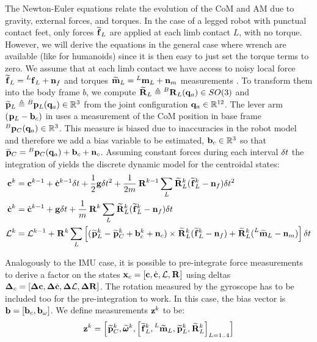 The Newton-Euler equations  relate the evolution of the CoM and AM due to gravity, external forces, and torques. 
In the case of a legged robot with punctual contact feet, only forces $\prescript{}{}{\widetilde{{\bf f}}}_{L}$ are applied at each limb contact $L$, with no torque. 
However, we will derive the equations in the general case where wrench are available (like for humanoids) since it is then easy to just set the 
torque terms to zero. 
We assume that at each limb contact we have access to noisy local force $\prescript{}{}{\widetilde{{\bf f}}}_{L} = \prescript{L}{}{{\bf f}}_{L} + {\bf n}_f$ and torques 
$\prescript{}{}{\widetilde{\bf m}}_{L} = \prescript{L}{}{\bf m}_{L} + {\bf n}_m$ measurements . 
To transform them into the body frame $b$, we compute $\prescript{}{}{\widetilde{{\bf R}}}_{L} \triangleq \prescript{B}{}{{\bf R}}_{L}({\bf q}_a)  \in SO(3)$ and $\prescript{}{}{\widetilde{{\bf p}}}_{L} \triangleq \prescript{B}{}{{\bf p}}_{L}({\bf q}_a) \in \mathbb{R}^3 $ from the joint configuration ${\bf q}_a  \in \mathbb{R}^{12}$. 
The lever arm $(\prescript{}{}{{\bf p}}_{L}-{\bf b}_c)$ in  uses a measurement of the CoM position in base frame $ \prescript{B}{}{{\bf p}}_{C}({\bf q}_a) \in \mathbb{R}^3$. 
This measure is biased due to inaccuracies in the robot model and therefore we add a bias variable to be estimated, ${\bf b}_c \in \mathbb{R}^3$ so that $\prescript{}{}{\widetilde{{\bf p}}}_{C} = \prescript{B}{}{{\bf p}}_{C}({\bf q}_a) + {\bf b}_c + {\bf n}_c$.
Assuming constant forces during each interval $\delta t$ 
the integration of  yields the discrete dynamic model for the centroidal states:
%
\begin{equation}
    \begin{split}
        {\bf c}^{k} &= {\bf c}^{k-1} + \dot{{\bf c}}^{k-1} \delta t+\frac{1}{2} {\bf g} \delta t^2 + \frac{1}{2m} \prescript{}{}{{\bf R}}_{}^{k-1} \sum_L \prescript{}{}{\widetilde{{\bf R}}}_{L}^k (\prescript{}{}{\widetilde{{\bf f}}}_{L}^k - {\bf n}_{f}) \delta t^2
        \\
        \dot{{\bf c}}^{k}&= \dot{{\bf c}}^{k-1} + {\bf g} \delta t + \frac{1}{m} \prescript{}{}{{\bf R}}_{}^k \sum_L\prescript{}{}{\widetilde{{\bf R}}}_{L}^k (\prescript{}{}{\widetilde{{\bf f}}}_{L}^k - {\bf n}_{f}) \delta t 
        \\
        \mathcal{L}^{k} &= \mathcal{L}^{k-1} +\prescript{}{}{{\bf R}}_{}^k \sum_L \left[ (\prescript{}{}{\widetilde{{\bf p}}}_{L}^k  - \prescript{}{}{\widetilde{{\bf p}}}_{C}^k +  {\bf b}_{c}^k + {\bf n}_{c}) \times \prescript{}{}{\widetilde{{\bf R}}}_{L}^k(\prescript{}{}{\widetilde{{\bf f}}}_{L}^k - {\bf n}_{f}) 
                                                        + \prescript{}{}{\widetilde{{\bf R}}}_{L}^k(\prescript{L}{}{\widetilde{\bf m}}_{L} - {\bf n}_m)\right]\delta t
    \end{split}
    \label{eq:COMDiscrete}
\end{equation}

Analogously to the IMU case, it is possible to pre-integrate force measurements to derive a factor on the states 
${\bf x}_c=[{\bf c}, \dot{{\bf c}}, \mathcal{L}, \prescript{}{}{{\bf R}}_{}]$ using deltas ${{\bm \Delta}}_c=[{{\bm \Delta}}{\bf c}, {{\bm \Delta}}\dot{{\bf c}}, {{\bm \Delta}}\mathcal{L}, {\bm \Delta {\bf R}}]$. 
The rotation measured by the gyroscope has to be included too for the pre-integration to work. 
In this case, the bias vector is ${\bf b} = [{\bf b}_c, {\bf b}_{\omega}]$. We define measurements  ${\bf z}^k$ to be:
%
\begin{equation}
    {\bf z}^k = \left[ \prescript{}{}{\widetilde{{\bf p}}}_{C}^k, \prescript{}{}{\widetilde{\pmb{\omega}}}_{}^k, \left[\prescript{}{}{\widetilde{{\bf f}}}_{L}^k, \prescript{L}{}{\widetilde{\bf m}}_{L}, \prescript{}{}{\widetilde{{\bf p}}}_{L}^k, \prescript{}{}{\widetilde{{\bf R}}}_{L}^k \right]_{L=1..4}\right]
\end{equation}

